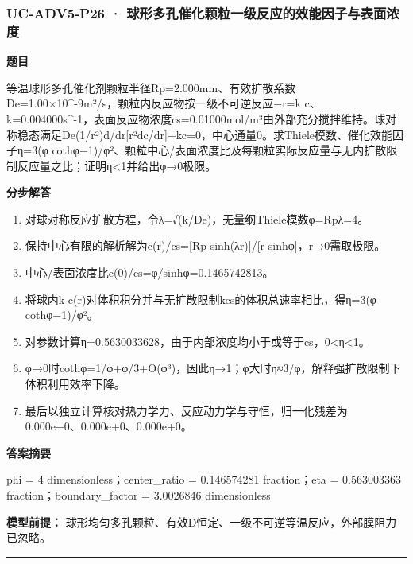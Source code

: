 \documentclass[UTF8,11pt,a4paper]{ctexart}
\begin{document}
\subsubsection*{UC-ADV5-P26 · 球形多孔催化颗粒一级反应的效能因子与表面浓度}
\noindent\textbf{题目}\par
等温球形多孔催化剂颗粒半径Rp=2.000mm、有效扩散系数De=1.00×10\textasciicircum{}-9m²/s，颗粒内反应物按一级不可逆反应−r=k c、k=0.004000s\textasciicircum{}-1，表面反应物浓度cs=0.01000mol/m³由外部充分搅拌维持。球对称稳态满足De(1/r²)d/dr[r²dc/dr]−kc=0，中心通量0。求Thiele模数、催化效能因子η=3(φ cothφ−1)/φ²、颗粒中心/表面浓度比及每颗粒实际反应量与无内扩散限制反应量之比；证明η<1并给出φ→0极限。\par
\medskip\noindent\textbf{分步解答}
\begin{enumerate}
\item 对球对称反应扩散方程，令λ=√(k/De)，无量纲Thiele模数φ=Rpλ=4。
\item 保持中心有限的解析解为c(r)/cs=[Rp sinh(λr)]/[r sinhφ]，r→0需取极限。
\item 中心/表面浓度比c(0)/cs=φ/sinhφ=0.1465742813。
\item 将球内k c(r)对体积积分并与无扩散限制kcs的体积总速率相比，得η=3(φ cothφ−1)/φ²。
\item 对参数计算η=0.5630033628，由于内部浓度均小于或等于cs，0<η<1。
\item φ→0时cothφ=1/φ+φ/3+O(φ³)，因此η→1；φ大时η≈3/φ，解释强扩散限制下体积利用效率下降。
\item 最后以独立计算核对热力学力、反应动力学与守恒，归一化残差为 0.000e+0、0.000e+0、0.000e+0。
\end{enumerate}
\noindent\textbf{答案摘要}\par
phi = 4 dimensionless；center\_ratio = 0.146574281 fraction；eta = 0.563003363 fraction；boundary\_factor = 3.0026846 dimensionless\par
\noindent\textbf{模型前提：}
球形均匀多孔颗粒、有效D恒定、一级不可逆等温反应，外部膜阻力已忽略。\par
\medskip\hrule\medskip
{}
\end{document}
